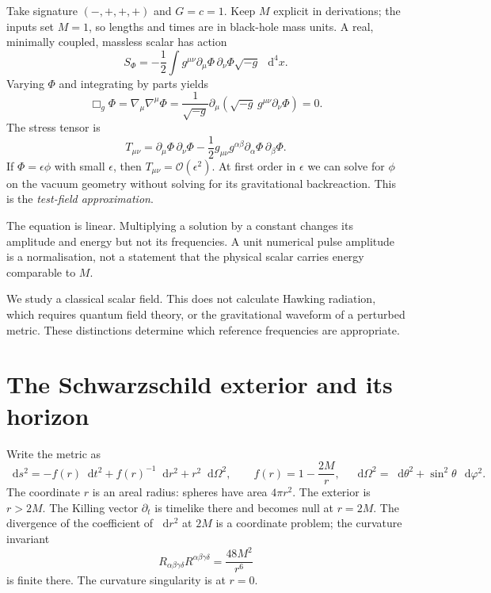 \documentclass[11pt,a4paper]{article}
\numberwithin{equation}{section}
\newcommand{\dd}{\mathop{}\!\mathrm{d}}
\newcommand{\pd}{\partial}
\newcommand{\OO}{\mathcal{O}}
\begin{document}
Take signature $(-,+,+,+)$ and $G=c=1$. Keep $M$ explicit in derivations;
the inputs set $M=1$, so lengths and times are in black-hole mass units.
A real, minimally coupled, massless scalar has action
\begin{equation}
 S_\Phi=-\frac12\int g^{\mu\nu}\pd_\mu\Phi\,\pd_\nu\Phi
             \sqrt{-g}\,\dd^4x .
\end{equation}
Varying $\Phi$ and integrating by parts yields
\begin{equation}\label{eq:kg}
 \Box_g\Phi=\nabla_\mu\nabla^\mu\Phi
 =\frac{1}{\sqrt{-g}}\pd_\mu
       \left(\sqrt{-g}\,g^{\mu\nu}\pd_\nu\Phi\right)=0 .
\end{equation}
The stress tensor is
\begin{equation}
 T_{\mu\nu}=\pd_\mu\Phi\,\pd_\nu\Phi
 -\frac12 g_{\mu\nu}g^{\alpha\beta}\pd_\alpha\Phi\,\pd_\beta\Phi .
\end{equation}
If $\Phi=\epsilon\phi$ with small $\epsilon$, then
$T_{\mu\nu}=\OO(\epsilon^2)$. At first order in $\epsilon$ we can solve
for $\phi$ on the vacuum geometry without solving for its gravitational
backreaction. This is the \emph{test-field approximation}.

The equation is linear. Multiplying a solution by a constant changes its
amplitude and energy but not its frequencies. A unit numerical pulse amplitude
is a normalisation, not a statement that the physical scalar carries energy
comparable to $M$.

We study a classical scalar field. This does not calculate Hawking radiation,
which requires quantum field theory, or the gravitational waveform of a
perturbed metric. These distinctions determine which reference frequencies
are appropriate.

\section{The Schwarzschild exterior and its horizon}\label{sec:geometry}

Write the metric as
\begin{equation}\label{eq:schwarzschild}
 \dd s^2=-f(r)\dd t^2+f(r)^{-1}\dd r^2+r^2\dd\Omega^2,\qquad
 f(r)=1-\frac{2M}{r},\quad
 \dd\Omega^2=\dd\theta^2+\sin^2\theta\,\dd\varphi^2 .
\end{equation}
The coordinate $r$ is an areal radius: spheres have area $4\pi r^2$.
The exterior is $r>2M$. The Killing vector $\pd_t$ is timelike there and
becomes null at $r=2M$. The divergence of the coefficient of $\dd r^2$
at $2M$ is a coordinate problem; the curvature invariant
\begin{equation}
 R_{\alpha\beta\gamma\delta}R^{\alpha\beta\gamma\delta}
 =\frac{48M^2}{r^6}
\end{equation}
is finite there. The curvature singularity is at $r=0$.
\end{document}
